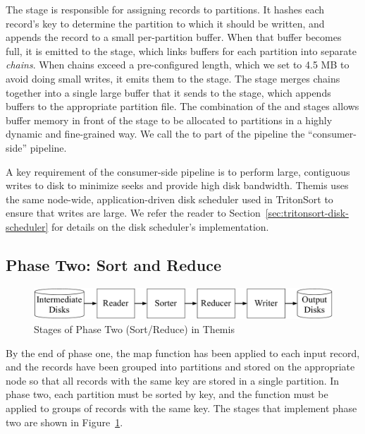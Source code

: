 The \Demuxbf stage is responsible for assigning records to partitions.  It
hashes each record's key to determine the partition to which it should be
written, and appends the record to a small per-partition buffer.  When that
buffer becomes full, it is emitted to the \Chainerbf stage, which links buffers
for each partition into separate \emph{chains}.  When chains exceed a
pre-configured length, which we set to 4.5 MB to avoid doing small writes, it
emits them to the \Coalescerbf stage.  The \Coalescerbf stage merges chains
together into a single large buffer that it sends to the \Writerbf stage,
which appends buffers to the appropriate partition file. The combination of the
\Chainer and \Coalescer stages allows buffer memory in front of the \Writer
stage to be allocated to partitions in a highly dynamic and fine-grained way.
We call the \Receiver to \Writer part of the pipeline the ``consumer-side''
pipeline.

A key requirement of the consumer-side pipeline is to perform large, contiguous
writes to disk to minimize seeks and provide high disk bandwidth.  Themis uses
the same node-wide, application-driven disk scheduler used in TritonSort to
ensure that writes are large. We refer the reader to
Section~\ref{sec:tritonsort-disk-scheduler} for details on the disk scheduler's
implementation.

\subsection{Phase Two: Sort and Reduce}
\label{sec:phase_two}
\label{sec:reduce}

\begin{figure}[h]
\centering
\includegraphics[width=\columnwidth]{themis/figures/phase_two.pdf}
\caption{\label{fig:phase_two} Stages of Phase Two (Sort/Reduce) in Themis}
\end{figure}

By the end of phase one, the map function has been applied to each input
record, and the records have been grouped into partitions and stored on the
appropriate node so that all records with the same key are stored in a single
partition.  In phase two, each partition must be sorted by key, and the \reduce
function must be applied to groups of records with the same key.  The stages
that implement phase two are shown in Figure~\ref{fig:phase_two}.

